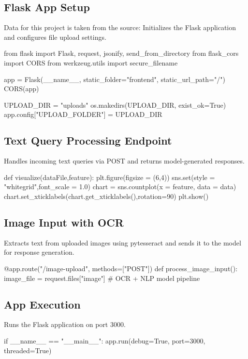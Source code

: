 \documentclass{josis}
\begin{document}
\subsection{Flask App Setup}
Data for this project is taken from the source: Initializes the Flask application and configures file upload settings.
\begin{python}
from flask import Flask, request, jsonify, send_from_directory
from flask_cors import CORS
from werkzeug.utils import secure_filename

app = Flask(__name__, static_folder="frontend", static_url_path="/")
CORS(app)

UPLOAD_DIR = "uploads"
os.makedirs(UPLOAD_DIR, exist_ok=True)
app.config["UPLOAD_FOLDER"] = UPLOAD_DIR

\end{python}
\subsection{Text Query Processing Endpoint}
Handles incoming text queries via POST and returns model-generated responses.
\begin{python}
def visualize(dataFile,feature):
       plt.figure(figsize = (6,4))
       sns.set(style = "whitegrid",font_scale = 1.0)
       chart = sns.countplot(x = feature, data = data)
       chart.set_xticklabels(chart.get_xticklabels(),rotation=90)
       plt.show()
  \end{python}

\subsection{Image Input with OCR}
Extracts text from uploaded images using pytesseract and sends it to the model for response generation.
\begin{python}
@app.route("/image-upload", methods=["POST"])
def process_image_input():
    image_file = request.files["image"]
    # OCR + NLP model pipeline

\end{python}

\subsection{App Execution}
Runs the Flask application on port 3000.
\begin{python}
if __name__ == "__main__":
    app.run(debug=True, port=3000, threaded=True)

\end{python}
\end{document}
